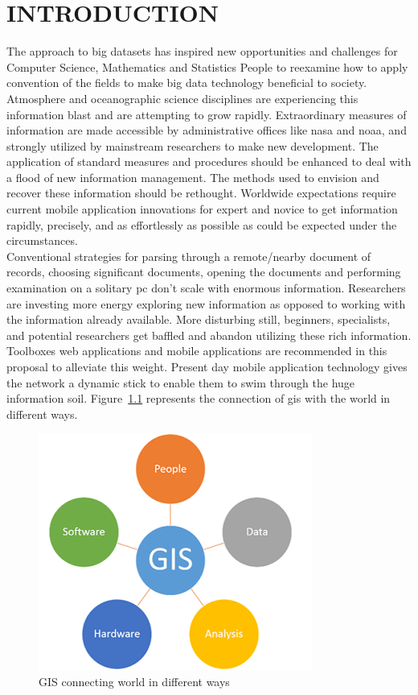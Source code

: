 \chapter{INTRODUCTION}
\label{chap:intro}

The approach to big datasets has inspired new opportunities and challenges for Computer Science, Mathematics and Statistics People to reexamine how to apply convention of the fields to make big data technology beneficial to society. Atmosphere and oceanographic science disciplines are experiencing this information blast and are attempting to grow rapidly. Extraordinary measures of information are made accessible by administrative offices like \gls{nasa} and \gls{noaa}, and strongly utilized by mainstream researchers to make new development. The application of standard measures and procedures should be enhanced to deal with a flood of new information management. The methods used to envision and recover these information should be rethought. Worldwide expectations require current mobile application innovations for expert and novice to get information rapidly, precisely, and as effortlessly as possible as could be expected under the circumstances. \\
Conventional strategies for parsing through a remote/nearby document of records, choosing significant documents, opening the documents and performing examination on a solitary \gls{pc} don't scale with enormous information. Researchers are investing more energy exploring new information as opposed to working with the information already available. More disturbing still, beginners, specialists, and potential researchers get baffled and abandon utilizing these rich information. Toolboxes web applications and mobile applications are recommended in this proposal to alleviate this weight. Present day mobile application technology gives the network a dynamic stick to enable them to swim through the huge information soil. Figure~\ref{fig:gis_world} represents the connection of \gls{gis} with the world in different ways.

    \begin{figure}[H]
            \centering
            \includegraphics[width=0.50\linewidth]{figures/ch1/gis.png}
            \caption{\label{fig:gis_world} GIS connecting world in different ways \cite{CDC}}
    \end{figure}

